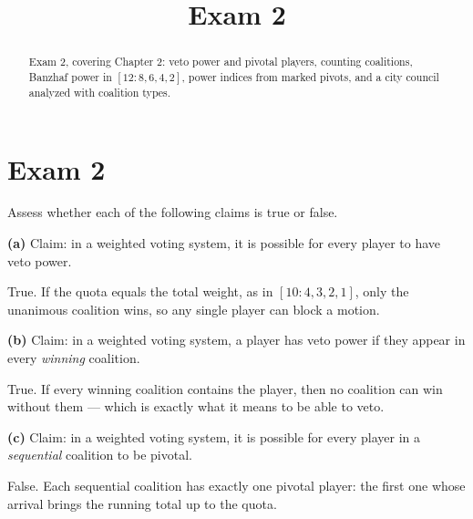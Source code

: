 \documentclass[12pt]{ximera}
\title{Exam 2}
\begin{document}
\begin{abstract}
Exam 2, covering Chapter 2: veto power and pivotal players, counting coalitions,
Banzhaf power in $[12:8,6,4,2]$, power indices from marked pivots, and a city council
analyzed with coalition types.
\end{abstract}
\maketitle

\section*{Exam 2}

\begin{problem}
Assess whether each of the following claims is true or false.

\begin{prompt}
\textbf{(a)} Claim: in a weighted voting system, it is possible for every player to
have veto power.

\begin{multipleChoice}
\end{multipleChoice}

\begin{feedback}
True. If the quota equals the total weight, as in $[10:4,3,2,1]$, only the unanimous
coalition wins, so any single player can block a motion.
\end{feedback}
\end{prompt}

\begin{prompt}
\textbf{(b)} Claim: in a weighted voting system, a player has veto power if they appear
in every \emph{winning} coalition.

\begin{multipleChoice}
\end{multipleChoice}

\begin{feedback}
True. If every winning coalition contains the player, then no coalition can win without
them --- which is exactly what it means to be able to veto.
\end{feedback}
\end{prompt}

\begin{prompt}
\textbf{(c)} Claim: in a weighted voting system, it is possible for every player in a
\emph{sequential} coalition to be pivotal.

\begin{multipleChoice}
\end{multipleChoice}

\begin{feedback}
False. Each sequential coalition has exactly one pivotal player: the first one whose
arrival brings the running total up to the quota.
\end{feedback}
\end{prompt}
\end{problem}
\end{document}
